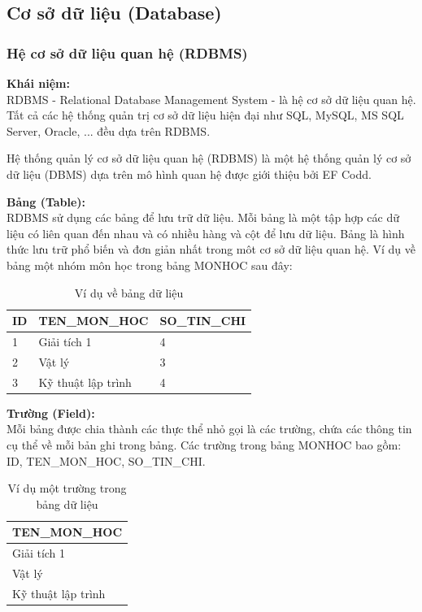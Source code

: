 \subsection{Cơ sở dữ liệu (Database)}
\subsubsection{Hệ cơ sở dữ liệu quan hệ (RDBMS)}
\textbf{Khái niệm:}\\

RDBMS - Relational Database Management System - là hệ cơ sở dữ liệu quan hệ. Tất cả các hệ thống quản trị cơ sở dữ liệu hiện đại như SQL, MySQL, MS SQL Server, Oracle, ... đều dựa trên RDBMS.

Hệ thống quản lý cơ sở dữ liệu quan hệ (RDBMS) là một hệ thống quản lý cơ sở dữ liệu (DBMS) dựa trên mô hình quan hệ được giới thiệu bởi EF Codd.

\textbf{Bảng (Table):}\\

RDBMS sử dụng các bảng để lưu trữ dữ liệu. Mỗi bảng là một tập hợp các dữ liệu có liên quan đến nhau và có nhiều hàng và cột để lưu dữ liệu. Bảng là hình thức lưu trữ phổ biến và đơn giản nhất trong môt cơ sở dữ liệu quan hệ. Ví dụ về bảng một nhóm môn học trong bảng MONHOC sau đây:\\
\begin{table}[!h]
    \centering
    \begin{tabular}{|l|l|l|}
    \hline
         \textbf{ID}&\textbf{TEN\_MON\_HOC}&\textbf{SO\_TIN\_CHI}\\
         \hline
         1&Giải tích 1&4\\
		\hline
		2&Vật lý&3\\
		\hline			
		3&Kỹ thuật lập trình&4\\
		\hline
    \end{tabular}
    \caption{Ví dụ về bảng dữ liệu}
\end{table}

\textbf{Trường (Field):}\\
	
	Mỗi bảng được chia thành các thực thể nhỏ gọi là các trường, chứa các thông tin cụ thể về mỗi bản ghi trong bảng. Các trường trong bảng MONHOC bao gồm: ID, TEN\_MON\_HOC, SO\_TIN\_CHI.\\
	\begin{table}[!h]
	    \centering
	    \begin{tabular}{|l|}
	        \hline
	        \textbf{TEN\_MON\_HOC}\\
	        \hline
	        Giải tích 1\\
	        \hline
	        Vật lý\\
	        \hline
	        Kỹ thuật lập trình\\
	        \hline
	    \end{tabular}
	    \caption{Ví dụ một trường trong bảng dữ liệu}
	\end{table}
	
